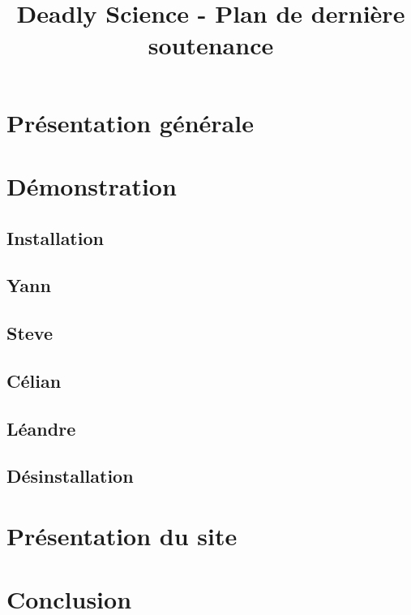 \documentclass{article}
\title{Deadly Science - Plan de dernière soutenance}
\begin{document}
\maketitle

\section{Présentation générale}

\section{Démonstration}

\subsection{Installation}

\subsection{Yann}

\subsection{Steve}

\subsection{Célian}

\subsection{Léandre}

\subsection{Désinstallation}

\section{Présentation du site}

\section{Conclusion}
\end{document}
